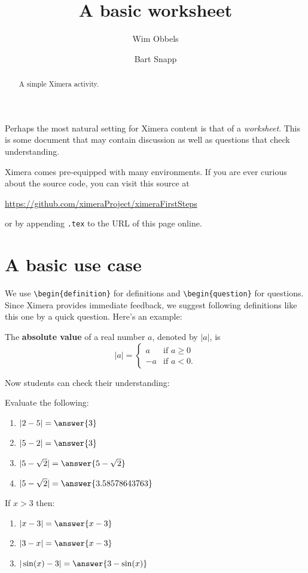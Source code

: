 \documentclass{ximera}
\title{A basic worksheet}
\author{Wim Obbels \and Bart Snapp}
\begin{document}
\begin{abstract}
    A simple Ximera activity.
\end{abstract}
\maketitle
\label{xim:aFirstActivity}

Perhaps the most natural setting for Ximera content is that of a
\textit{worksheet}. This is some document that may contain discussion as well
as questions that check understanding.

Ximera comes pre-equipped with many environments.  If you are ever curious about
the source code, you can visit this source at

\begin{center}
    \url{https://github.com/ximeraProject/ximeraFirstSteps}
\end{center}
or by appending \verb|.tex| to the URL of this page online. 


\section{A basic use case}
We use \verb|\begin{definition}| for definitions and \verb|\begin{question}| for
questions. Since Ximera provides immediate feedback, we suggest following
definitions like this one by a quick question. Here's an example:

\begin{definition}\label{def:absolute_value}
    The \textbf{absolute value} of a real number $a$, denoted by $|a|$, is
    \[
        |a| = \begin{cases}
            a  & \text{if $a \geq 0$} \\
            -a & \text{if $a<0$.}
        \end{cases}
    \]
\end{definition}
Now students can check their understanding:

\begin{question}
    Evaluate the following:
    \begin{enumerate}
        \item $|2-5| = \answer{3}$
        \item $|5-2| = \answer{3}$
        \item $|5-\sqrt{2}| = \answer{5-\sqrt{2}}$
        \item $|5-\sqrt{2}| = \answer{3.58578643763}$
    \end{enumerate}
    If $x > 3$ then:
    \begin{enumerate}
        \item $|x - 3| = \answer{x - 3}$
        \item $|3 - x| = \answer{x - 3}$
        \item $|\sin(x) - 3| = \answer{3 - \sin(x)}$
    \end{enumerate}
\end{question}
\end{document}
